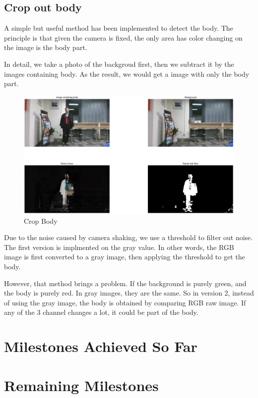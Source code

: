 \documentclass[conference,compsoc]{IEEEtran}
\begin{document}
\subsection{Crop out body}
\par
A simple but useful method has been implemented to detect the body. The principle is that given the camera is fixed, the only area has color changing on the image is the body part.
\par
In detail, we take a photo of the backgroud first, then we subtract it by the images containing body. As the result, we would get a image with only the body part.
\begin{figure}[h]
	\centering
	\includegraphics[width=\linewidth]{./Pic/CropBody.png}
	\caption{Crop Body}
\end{figure}
\par
Due to the noise caused by camera shaking, we use a threshold to filter out noise. The first version is implmented on the gray value. In other words, the RGB image is first converted to a gray image, then applying the threshold to get the body.
\par
However, that method brings a problem. If the background is purely green, and the body is purely red. In gray images, they are the same. So in version 2, instead of using the gray image, the body is obtained by comparing RGB raw image. If any of the 3 channel changes a lot, it could be part of the body.

\section{Milestones Achieved So Far}

\section{Remaining Milestones}


% 
% 
\end{document}
